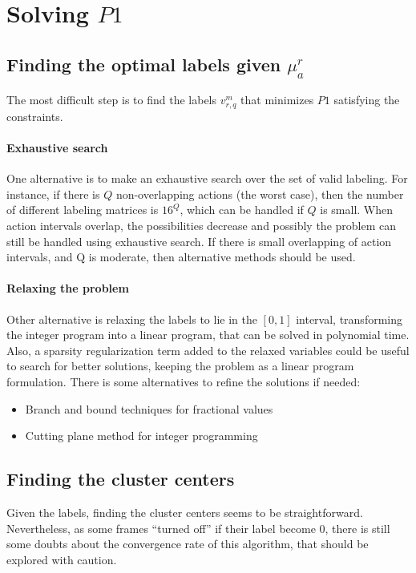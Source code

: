 \documentclass[11pt,letterpaper]{article}
\newcommand{\+}[1]{\ensuremath{{\boldsymbol #1}}}
\begin{document}
\section{Solving $P1$}

\subsection{Finding the optimal labels given $\mu_{a}^r$}

The most difficult step is to find the labels $v_{r,q}^m$ that minimizes $P1$ satisfying the constraints. 

\paragraph{Exhaustive search} One alternative is to make an exhaustive search over the set of valid labeling. For instance, if there is $Q$ non-overlapping actions (the worst case), then the number of different labeling matrices is $16^Q$, which can be handled if $Q$ is small. When action intervals overlap, the possibilities decrease and possibly the problem can still be handled using exhaustive search. If there is small overlapping of action intervals, and Q is moderate, then alternative methods should be used.

\paragraph{Relaxing the problem} Other alternative is relaxing the labels to lie in the $[0,1]$ interval, transforming the integer program into a linear program, that can be solved in polynomial time. Also, a sparsity regularization  term added to the relaxed variables could be useful to search for better solutions, keeping the problem as a linear program formulation. There is some alternatives to refine the solutions if needed:

\begin{itemize}
\item Branch and bound techniques for fractional values
\item Cutting plane method for integer programming
\end{itemize}

\subsection{Finding the cluster centers}
Given the labels, finding the cluster centers seems to be straightforward. Nevertheless, as some frames ``turned off'' if their  label become 0, there is still some doubts about the convergence rate of this algorithm, that should be explored with caution. 
\end{document}
